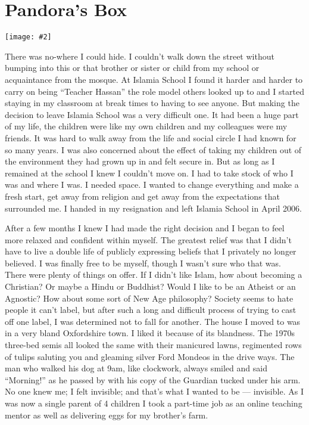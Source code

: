 \documentclass[12pt]{memoir}
\newcommand{\img}[3]{\begin{center}%
\texttt{[image: \#2]}\\{\small\em#3}%
\end{center}}
\begin{document}
\chapter{Pandora’s Box}

\img{scale=0.5}{Pandoras_Box.jpg}{}

There was no-where I could hide.
I couldn’t walk down the street without bumping into this or that brother
or sister or child from my school or acquaintance from the mosque.
At Islamia School I found it harder and harder to carry on
being “Teacher Hassan” the role model others looked up to
and I started staying in my classroom at break times
to  having to see anyone.
But making the decision to leave Islamia School was a very difficult one.
It had been a huge part of my life, the children were like my own children
and my colleagues were my friends.
It was hard to walk away from the life and social circle
I had known for so many years.
I was also concerned about the effect of taking my children
out of the environment they had grown up in and felt secure in.
But as long as I remained at the school I knew I couldn’t move on.
I had to take stock of who I was and where I was.
I needed space.
I wanted to change everything and make a fresh start,
get away from religion and get away from the expectations that surrounded me.
I handed in my resignation and left Islamia School in April 2006.

After a few months I knew I had made the right decision
and I began to feel more relaxed and confident within myself.
The greatest relief was that I didn’t have to live a double life
of publicly expressing beliefs that I privately no longer believed.
I was finally free to be myself, though I wasn’t sure who that was.
There were plenty of things on offer.
If I didn’t like Islam, how about becoming a Christian?
Or maybe a Hindu or Buddhist?
Would I like to be an Atheist or an Agnostic?
How about some sort of New Age philosophy?
Society seems to hate people it can’t label,
but after such a long and difficult process of trying to cast off one label,
I was determined not to fall for another.
The house I moved to was in a very bland Oxfordshire town.
I liked it because of its blandness.
The 1970s three-bed semis all looked the same with their manicured lawns,
regimented rows of tulips saluting you
and gleaming silver Ford Mondeos in the drive ways.
The man who walked his dog at 9am, like clockwork, always smiled
and said “Morning!” as he passed by with his copy
of the Guardian tucked under his arm.
No one knew me; I felt invisible; and that’s what I wanted to be — invisible.
As I was now a single parent of 4 children I took a part-time job
as an online teaching mentor as well as delivering eggs for my brother’s farm.
\end{document}
